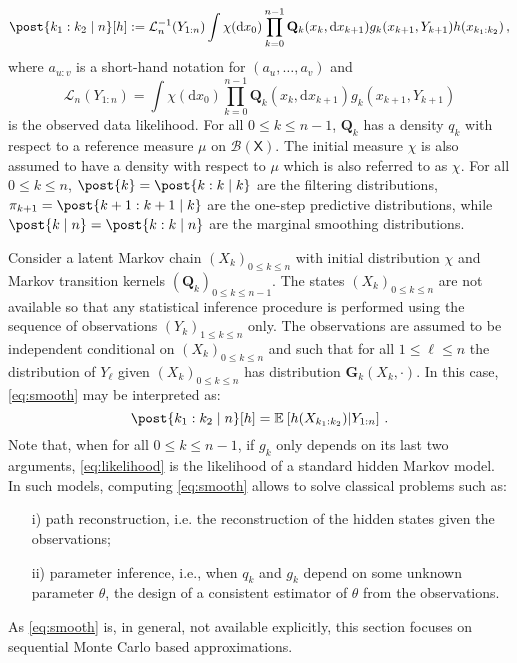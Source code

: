 \documentclass[nolayout]{article}
\newcommand{\eqsp}{\,}
\def\Xset{\mathsf{X}}
\newcommand{\mk}{\kernel{G}}
\newcommand{\hk}{\kernel{Q}}
\newcommand{\md}[1]{g_{#1}}
\newcommand{\llh}[1]{\mathcal{L}_{#1}}
\newcommand{\pred}[1]{\pi_{#1}}
\newcommand{\parvec}{\theta}
\newcommand{\kernel}[1]{\mathbf{#1}}
\newcommand{\hd}[1]{q_{#1}}
\def\pE{\mathbb{E}}
\newcommand{\rmd}{\ensuremath{\mathrm{d}}}
\newcommand{\eqdef}{\ensuremath{:=}}
\begin{document}
\begin{equation}
\label{eq:smooth}
\post{k_1:k_2 \mid n}[h] \eqdef \llh{n}^{-1}(Y_{1:n})\int \chi(\rmd x_0)\prod_{k=0}^{n-1}\hk_{k}(x_{k},\rmd x_{k+1})\md{k}(x_{k+1},Y_{k+1})h(x_{k_1:k_2})\eqsp,
\end{equation}
where  $a_{u:v}$ is a short-hand notation for $(a_u,\ldots,a_v)$ and
\begin{equation}
\label{eq:likelihood}
\llh{n}(Y_{1:n})  = \int \chi(\rmd x_0)\prod_{k=0}^{n-1}\hk_{k}(x_{k},\rmd x_{k+1})\md{k}(x_{k+1},Y_{k+1})
\end{equation}
is the observed data likelihood. 
For all $0\leqslant k \leqslant n-1$, $\hk_{k}$ has a density $\hd{k}$ with respect to a reference measure $\mu$ on $\mathcal{B}(\Xset)$. The initial measure $\chi$ is also assumed to have a density with respect to $\mu$ which is also referred to as $\chi$. 
For all $0\leqslant k\leqslant n$, $\post{k}=\post{k:k\mid k}$ are the filtering distributions, $\pred{k+1}=\post{k+1:k+1\mid k}$ are the one-step predictive distributions, while $\post{k\mid n}=\post{k:k\mid n}$ are the marginal smoothing distributions. 

 Consider a latent  Markov chain $(X_k)_{0\leqslant k\leqslant n}$  with initial distribution $\chi$ and Markov transition kernels $(\hk_{k})_{0\leqslant k \leqslant n-1}$. The states $(X_k)_{0\leqslant k\leqslant n}$ are not available so that any statistical inference procedure is performed using the sequence of observations $(Y_k)_{1 \leqslant k\leqslant n}$ only. The observations are assumed to be independent conditional on $(X_k)_{0\leqslant k\leqslant n}$ and such that for all $1\leqslant\ell \leqslant n$ the distribution of $Y_\ell$ given $(X_k)_{0\leqslant k\leqslant n}$ has distribution $\mk_{k}(X_k,\cdot)$. In this case, \eqref{eq:smooth} may be interpreted as:
\[
\post{k_1:k_2 \mid n}[h]  = \pE_{}\left[h(X_{k_1:k_2})\middle | Y_{1:n}\right]\eqsp.
\]
Note that, when for all $0\leqslant k \leqslant n -1$, if $\md{k}$ only depends on its last two arguments, \eqref{eq:likelihood} is the likelihood of a standard hidden Markov model.  In such models, computing \eqref{eq:smooth} allows to solve classical problems such as:  
\begin{enumerate}
\item[i)] path reconstruction, i.e. the reconstruction of the hidden states given the observations;
\item[ii)] parameter inference, i.e., when $\hd{k}$ and $\md{k}$ depend on some unknown parameter $\parvec$, the design of a consistent estimator of $\theta$ from the observations.
\end{enumerate}
As  \eqref{eq:smooth} is, in general, not available explicitly,  this section focuses on sequential Monte Carlo based approximations.
\end{document}
